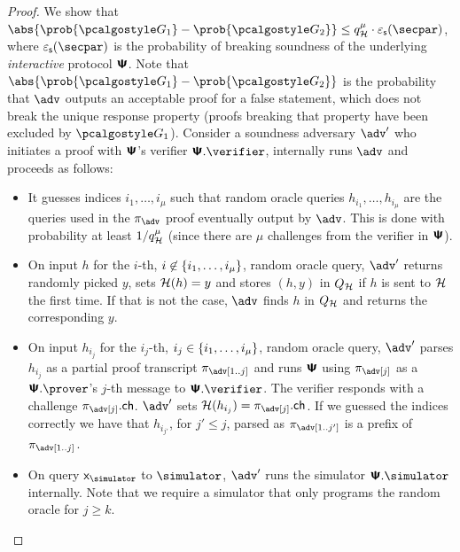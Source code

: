 \documentclass[runningheads,10pt]{llncs}
\begin{document}
\begin{proof}
  We show that
  $\abs{\prob{\game{1}} - \prob{\game{2}}} \leq q_{\ro}^{\mu} \cdot \epss(\secpar)$,
  where $\epss(\secpar)$ is the probability of breaking soundness of the underlying
  \emph{interactive} protocol $\bm{\mathsf{\Psi}}$. Note that
  $\abs{\prob{\game{1}} - \prob{\game{2}}}$ is the probability that $\adv$
  outputs an acceptable proof for a false statement, which does not break the
  unique response property (proofs breaking that property have been excluded by
  $\game{1}$). Consider a soundness adversary $\adv'$ who initiates a proof with
  $\bm{\mathsf{\Psi}}$'s verifier $\ps.\verifier$, internally runs $\adv$ and proceeds as
  follows:
  \begin{itemize}
  \item It guesses indices $i_1, \ldots, i_\mu$ such that random oracle queries
    $h_{i_1}, \ldots, h_{i_\mu}$ are the queries used in the $\zkproof_\adv$
    proof eventually output by $\adv$. This is done with probability at least
    $1/q_{\mathcal{H}}^\mu$ (since there are $\mu$ challenges from the verifier in
    $\bm{\mathsf{\Psi}}$).
  \item On input $h$ for the $i$-th,
    $i \not\in \{{i_1}, \ldots, {i_\mu}\}$, random oracle query, $\adv'$
    returns randomly picked $y$, sets $\mathcal{H}(h) = y $ and stores $(h, y)$ in
    $Q_{\mathcal{H}}$ if $h$ is sent to $\mathcal{H}$ the first time. If that is not the case,
    $\adv$ finds $h$ in $Q_{\mathcal{H}}$ and returns the corresponding $y$.
  \item On input $h_{i_j}$ for the $i_j$-th,
    $i_j \in \{{i_1}, \ldots, {i_\mu}\}$, random oracle query, $\adv'$
    parses $h_{i_j}$ as a partial proof transcript $\zkproof_\adv[1..j]$ and runs
    $\bm{\mathsf{\Psi}}$ using $\zkproof_\adv[j]$ as a $\ps.\prover$'s $j$-th message to
    $\ps.\verifier$. The verifier responds with a challenge
    $\zkproof_\adv[j].\ch$. $\adv'$ sets $\ro(h_{i_j}) = \zkproof_\adv[j].\ch$. If we guessed the indices correctly we have that $h_{i_{j'}}$, for $j' \leq j$, parsed as $\zkproof_\adv[1..j']$ is a prefix of $\zkproof_\adv[1..j]$.
  \item On query $\inp_\simulator$ to $\simulator$, $\adv'$ runs the simulator
    $\ps.\simulator$ internally. Note that we require a simulator that only programs the random oracle for $j \geq k$.


\end{itemize}
\end{proof}
\end{document}
